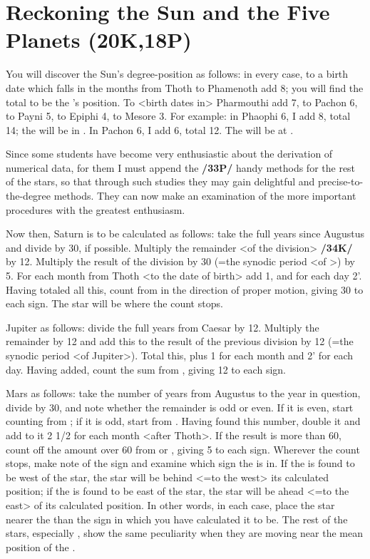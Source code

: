 \section{Reckoning the Sun and the Five Planets (20K,18P)}
You will discover the Sun’s degree-position as follows: in every case, to a birth date which falls in the months from Thoth to Phamenoth add 8\deg; you will find the total to be the \Sun’s position. To <birth dates in> Pharmouthi add 7\deg, to Pachon 6\deg, to Payni 5\deg, to Epiphi 4\deg, to Mesore 3\deg. For example: in Phaophi 6, I add 8\deg, total 14; the \Sun\xspace will be in \Libra\xspace 14\deg. In Pachon 6, I add 6\deg, total 12. The \Sun will be at \Taurus\xspace 12\deg.

Since some students have become very enthusiastic about the derivation of numerical data, for them I must append the \textbf{/33P/} handy methods for the rest of the stars, so that through such studies they may gain delightful and precise-to-the-degree methods. They can now make an examination of the more important procedures with the greatest enthusiasm.

Now then, Saturn is to be calculated as follows: take the full years since Augustus and divide by 30, if possible. Multiply the remainder <of the division> \textbf{/34K/} by 12\deg. Multiply the result of the division by 30 (=the synodic period <of \Saturn>) by 5\deg. For each month from Thoth <to the date of birth> add 1\deg, and for each day 2'. Having totaled all this, count from \Cancer\xspace in the direction of proper motion, giving 30\deg\xspace to each sign. The star will be where the count stops.

Jupiter as follows: divide the full years from Caesar by 12. Multiply the remainder by 12\deg\xspace and add
this to the result of the previous division by 12 (=the synodic period <of Jupiter>). Total this, plus 1\deg\xspace for each month and 2' for each day. Having added, count the sum from \Taurus, giving 12 to each sign.

Mars as follows: take the number of years from Augustus to the year in question, divide by 30, and note whether the remainder is odd or even. If it is even, start counting from \Aries; if it is odd, start from \Libra. Having found this number, double it and add to it 2 1/2 for each month <after Thoth>. If the result is more than 60, count off the amount over 60 from \Libra\xspace or \Aries, giving 5 to each sign. Wherever the count stops, make note of the sign and examine which sign the \Sun\xspace is in. If the \Sun\xspace is found to be west of the star, the star will be behind <=to the west> its calculated position; if the \Sun\xspace is found to be east of the star, the star will be ahead <=to the east> of its calculated position. In other words, in each case, place the
star nearer the \Sun\xspace than the sign in which you have calculated it to be. The rest of the stars, especially \Venus, show the same peculiarity when they are moving near the mean position of the \Sun.


